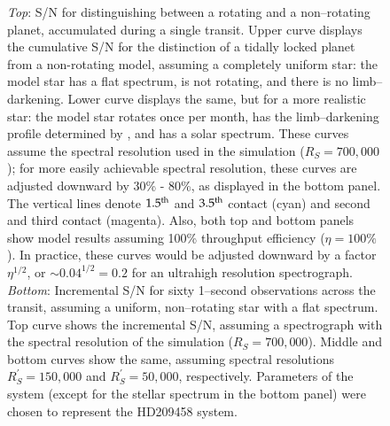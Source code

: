 \begin{figure}[p]
\caption[S/N for distinguishing rot. vs. non-rot. planet, vs. $t$,
across transit.]{{\it Top}: S/N for distinguishing between a rotating
and a non--rotating planet, accumulated during a single transit.
Upper curve displays the cumulative S/N for the distinction of a
tidally locked planet from a non-rotating model, assuming a completely
uniform star: the model star has a flat spectrum, is not rotating, and
there is no limb--darkening.  Lower curve displays the same, but for a
more realistic star: the model star rotates once per month, has the
limb--darkening profile determined by \citet{knutson_et_al2007a}, and
has a solar spectrum.  These curves assume the spectral resolution
used in the simulation ($R_S = 700,000$); for more easily achievable
spectral resolution, these curves are adjusted downward by 30\% -
80\%, as displayed in the bottom panel.  The vertical lines denote
$1.5^{\rm th}$ and $3.5^{\rm th}$ contact (cyan) and second and third
contact (magenta).  Also, both top and bottom panels show model
results assuming 100\% throughput efficiency ($\eta = 100\%$).  In
practice, these curves would be adjusted downward by a factor
$\eta^{1/2}$, or $\sim 0.04^{1/2} = 0.2$ for an ultrahigh resolution
spectrograph.  {\it Bottom}: Incremental S/N for sixty 1--second
observations across the transit, assuming a uniform, non--rotating
star with a flat spectrum.  Top curve shows the incremental S/N,
assuming a spectrograph with the spectral resolution of the simulation
($R_S = 700,000$).  Middle and bottom curves show the same, assuming
spectral resolutions $R^\prime_S = 150,000$ and $R^\prime_S = 50,000$,
respectively.  Parameters of the system (except for the stellar
spectrum in the bottom panel) were chosen to represent the HD209458
system.}
\label{rot_fig:inc. and cum.}
\end{figure}



